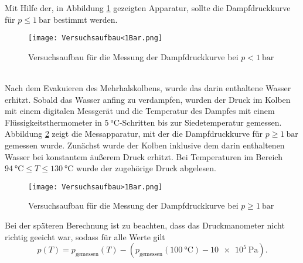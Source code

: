 Mit Hilfe der, in Abbildung \ref{Versuchsaufbau<1} gezeigten Apparatur, sollte die Dampfdruckkurve für $p\leq \SI{1}{\bar}$ bestimmt werden.
\begin{figure}[h!]
	\centering
	\texttt{[image: Versuchsaufbau<1Bar.png]}
	\caption{Versuchsaufbau für die Messung der Dampfdruckkurve bei $p<\SI{1}{\bar}$\cite{V203}}
	\label{Versuchsaufbau<1}
\end{figure} \\
Nach dem Evakuieren des Mehrhalskolbens, wurde das darin enthaltene Wasser erhitzt. Sobald das Wasser anfing zu verdampfen, wurden der Druck im Kolben mit einem digitalen Messgerät und die Temperatur des Dampfes mit einem Flüssigkeitsthermometer in $\SI{5}{\celsius}$-Schritten bis zur Siedetemperatur gemessen. \\
\newpage
Abbildung \ref{Versuchsaufbau>1} zeigt die Messapparatur, mit der die Dampfdruckkurve für $p \geq \SI{1}{\bar}$ gemessen wurde. Zunächst wurde der Kolben inklusive dem darin enthaltenen Wasser bei konstantem äußerem Druck erhitzt. Bei Temperaturen im Bereich $\SI{94}{\celsius}\leq T\leq\SI{130}{\celsius}$ wurde der zugehörige Druck abgelesen.
\begin{figure}
	\centering
	\texttt{[image: Versuchsaufbau>1Bar.png]}
	\caption{Versuchsaufbau für die Messung der Dampfdruckkurve bei $p\geq\SI{1}{\bar}$\cite{V203}}
	\label{Versuchsaufbau>1}
\end{figure}
Bei der späteren Berechnung ist zu beachten, dass das Druckmanometer nicht richtig geeicht war, sodass für alle Werte gilt
\begin{equation}
	p(T) = p_\text{gemessen}(T) - (p_\text{gemessen}(\SI{100}{\celsius})-\SI{10e+5}{\pascal}).
\end{equation}